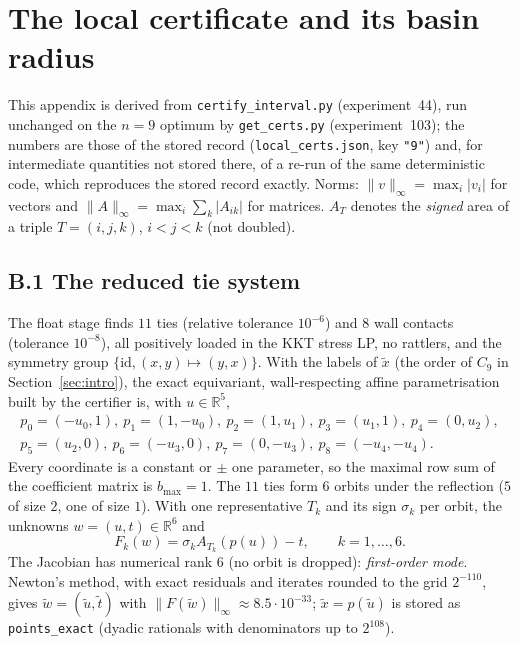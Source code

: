 \documentclass[11pt]{amsart}
\theoremstyle{definition}
\newcommand{\R}{\mathbb{R}}
\begin{document}
\section{The local certificate and its basin radius}\label{app:basin}

This appendix is derived from \texttt{certify\_interval.py} (experiment~44), run unchanged on the $n = 9$ optimum by \texttt{get\_certs.py} (experiment~103); the numbers are those of the stored record (\texttt{local\_certs.json}, key \texttt{"9"}) and, for intermediate quantities not stored there, of a re-run of the same deterministic code, which reproduces the stored record exactly. Norms: $\|v\|_\infty = \max_i\lvert v_i\rvert$ for vectors and $\|A\|_\infty = \max_i\sum_k\lvert A_{ik}\rvert$ for matrices. $A_T$ denotes the \emph{signed} area of a triple $T = (i,j,k)$, $i<j<k$ (not doubled).

\subsection*{B.1 The reduced tie system}
The float stage finds $11$ ties (relative tolerance $10^{-6}$) and $8$ wall contacts (tolerance $10^{-8}$), all positively loaded in the KKT stress LP, no rattlers, and the symmetry group $\{\mathrm{id}, (x,y)\mapsto(y,x)\}$. With the labels of $\tilde x$ (the order of $C_9$ in Section~\ref{sec:intro}), the exact equivariant, wall-respecting affine parametrisation built by the certifier is, with $u \in \R^5$,
\begin{equation}\label{eq:param}
\begin{gathered}
 p_0 = (-u_0, 1),\ p_1 = (1, -u_0),\ p_2 = (1, u_1),\ p_3 = (u_1, 1),\ p_4 = (0, u_2),\\
 p_5 = (u_2, 0),\ p_6 = (-u_3, 0),\ p_7 = (0, -u_3),\ p_8 = (-u_4, -u_4).
\end{gathered}
\end{equation}
Every coordinate is a constant or $\pm$ one parameter, so the maximal row sum of the coefficient matrix is $b_{\max} = 1$. The $11$ ties form $6$ orbits under the reflection ($5$ of size $2$, one of size $1$). With one representative $T_k$ and its sign $\sigma_k$ per orbit, the unknowns $w = (u, t) \in \R^6$ and
\[
 F_k(w) = \sigma_k A_{T_k}(p(u)) - t, \qquad k = 1,\dots,6 .
\]
The Jacobian has numerical rank $6$ (no orbit is dropped): \emph{first-order mode}. Newton's method, with exact residuals and iterates rounded to the grid $2^{-110}$, gives $\tilde w = (\tilde u, \tilde t)$ with $\|F(\tilde w)\|_\infty \approx 8.5\cdot10^{-33}$; $\tilde x = p(\tilde u)$ is stored as \texttt{points\_exact} (dyadic rationals with denominators up to $2^{108}$).
\end{document}
